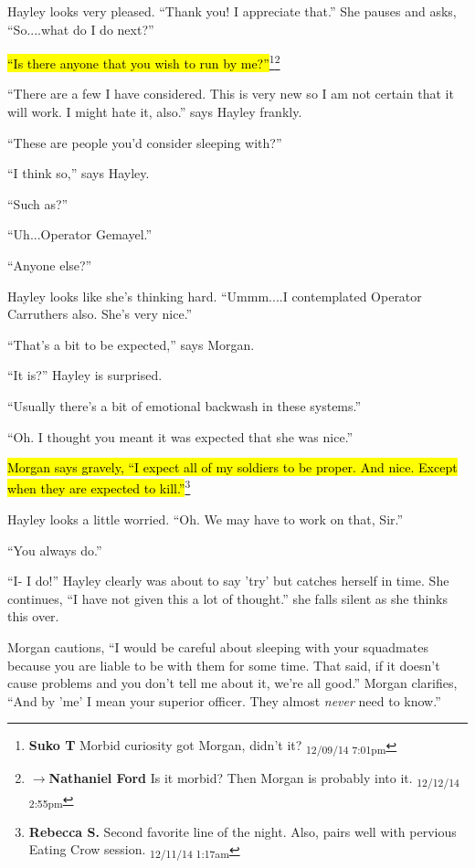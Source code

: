 Hayley looks very pleased.  ``Thank you!  I appreciate that.''  She pauses and asks, ``So....what do I do next?''

\hl{``Is there anyone that you wish to run by me?''}\footnote{\textbf{Suko T }Morbid curiosity got Morgan, didn't it? \textsubscript{12/09/14 7:01pm}}\footnote{$\rightarrow$\textbf{Nathaniel Ford }Is it morbid? Then Morgan is probably into it. \textsubscript{12/12/14 2:55pm}}

``There are a few I have considered.  This is very new so I am not certain that it will work.  I might hate it, also.'' says Hayley frankly.

``These are people you'd consider sleeping with?''

``I think so,'' says Hayley.

``Such as?''

``Uh...Operator Gemayel.''

``Anyone else?''

Hayley looks like she's thinking hard.  ``Ummm....I contemplated Operator Carruthers also. She's very nice.''

``That's a bit to be expected,'' says Morgan.

``It is?'' Hayley is surprised.

``Usually there's a bit of emotional backwash in these systems.''

``Oh.  I thought you meant it was expected that she was nice.'' 

\hl{Morgan says gravely, ``I expect all of my soldiers to be proper.  And nice.  Except when they are expected to kill.''}\footnote{\textbf{Rebecca S. }Second favorite line of the night.  Also, pairs well with pervious Eating Crow session. \textsubscript{12/11/14 1:17am}}

Hayley looks a little worried. ``Oh.  We may have to work on that, Sir.''

``You always do.''

``I- I do!'' Hayley clearly was about to say 'try' but catches herself in time.  She continues, ``I have not given this a lot of thought.'' she falls silent as she thinks this over.

Morgan cautions, ``I would be careful about sleeping with your squadmates because you are liable to be with them for some time.  That said, if it doesn't cause problems and you don't tell me about it, we're all good.''  Morgan clarifies, ``And by 'me' I mean your superior officer.  They almost \textit{never} need to know.''

